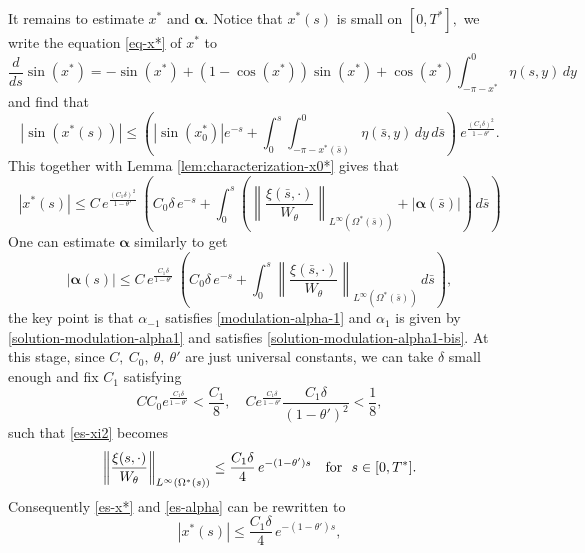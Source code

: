 \documentclass[12pt]{amsart}
\numberwithin{equation}{section}
\numberwithin{equation}{section}
\begin{document}
    It remains to estimate $x^*$ and $\boldsymbol\alpha.$  Notice that $x^*(s)$ is small on $[0, T^*],$  we write the  equation \eqref{eq-x*} of $x^*$ to
    \begin{equation*}
    \frac{d}{ds}\sin(x^*)=-\sin(x^*)+(1-\cos(x^*))\sin(x^*)+\cos(x^*)\int_{-\pi-x^*}^0 \eta(  s,  y)\,dy
    \end{equation*}
    and  find that
    \begin{equation*}
    | \sin(x^*(s))|\leq  \left(|\sin(x^*_0)|e^{-s}+  \int_0^s\int_{-\pi-x^*(\bar s)}^0 \eta( \bar s,  y)\,dy \, d\bar s     \right)~e^{\frac{(C_1\delta)^2}{1-\theta'}}.
    \end{equation*}
    This together with Lemma \ref{lem:characterization-x0*} gives that 
    \begin{equation}\label{es-x*}
|x^*(s)| \leq C\,e^{\frac{(C_1\delta)^2}{1-\theta'}}~ \left(C_0 \delta\,e^{-s}+  \int_0^s  \left( \left\| \frac{\xi(\bar s, \cdot)}{W_\theta} \right\|_{L^\infty(\Omega^*(\bar s))}+|\boldsymbol\alpha(\bar s)|\right)  \, d\bar s   \right)
    \end{equation}
  One can  estimate   $\boldsymbol\alpha$ similarly to get
   \begin{equation}\label{es-alpha}
| \boldsymbol\alpha  (s)| \leq C \,e^{\frac{C_1\delta}{1-\theta'}}~  \left(C_0 \delta \,e^{-s}+  \int_0^s  \left\| \frac{\xi(\bar s, \cdot)}{W_\theta} \right\|_{L^\infty(\Omega^*(\bar s))}  \, d\bar s   \right),
    \end{equation}
   the key point is that $\alpha_{-1}$  satisfies \eqref{modulation-alpha-1} and  $\alpha_1$ is given by \eqref{solution-modulation-alpha1} and satisfies \eqref{solution-modulation-alpha1-bis}.
      At this stage,  since $C, ~C_0, ~\theta, ~\theta'$ are just universal constants,    we can take  $\delta$   small enough  and  fix $C_1$ satisfying
    \begin{equation}
    CC_0 e^{\frac{C_1\delta}{1-\theta'}}<\frac{C_1}{8},\quad Ce^{\frac{C_1\delta}{1-\theta'}}{\frac{C_1\delta}{(1-\theta')^2}}<\frac{1}{8},
    \end{equation}
such that 
   \eqref{es-xi2}  becomes  
       \begin{equation}\label{es-xi3}
  \left\| \frac{\xi(s, \cdot)}{W_\theta}\right \|_{L^\infty(\Omega^*(s))}\leq \frac{C_1\delta}{4}\,e^{-(1-\theta')s}\quad {\rm for}~~s\in[0, T^*].
    \end{equation}
Consequently  \eqref{es-x*} and \eqref{es-alpha} can be rewritten to
       \begin{equation} 
 |x^*(s)| \leq  \frac{C_1\delta}{4}\,e^{-(1-\theta')s},
    \end{equation}
\end{document}

